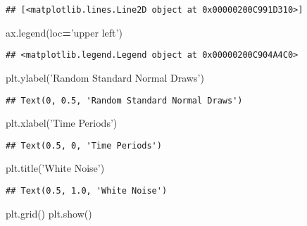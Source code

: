 \documentclass[
]{book}
\newenvironment{Shaded}{\begin{snugshade}}{\end{snugshade}}
\newcommand{\NormalTok}[1]{#1}
\newcommand{\OperatorTok}[1]{\textcolor[rgb]{0.81,0.36,0.00}{\textbf{#1}}}
\newcommand{\StringTok}[1]{\textcolor[rgb]{0.31,0.60,0.02}{#1}}
\begin{document}
\begin{verbatim}
## [<matplotlib.lines.Line2D object at 0x00000200C991D310>]
\end{verbatim}

\begin{Shaded}
\begin{Highlighting}[]
\NormalTok{ax.legend(loc}\OperatorTok{=}\StringTok{'upper left'}\NormalTok{)}
\end{Highlighting}
\end{Shaded}

\begin{verbatim}
## <matplotlib.legend.Legend object at 0x00000200C904A4C0>
\end{verbatim}

\begin{Shaded}
\begin{Highlighting}[]
\NormalTok{plt.ylabel(}\StringTok{'Random Standard Normal Draws'}\NormalTok{)}
\end{Highlighting}
\end{Shaded}

\begin{verbatim}
## Text(0, 0.5, 'Random Standard Normal Draws')
\end{verbatim}

\begin{Shaded}
\begin{Highlighting}[]
\NormalTok{plt.xlabel(}\StringTok{'Time Periods'}\NormalTok{)}
\end{Highlighting}
\end{Shaded}

\begin{verbatim}
## Text(0.5, 0, 'Time Periods')
\end{verbatim}

\begin{Shaded}
\begin{Highlighting}[]
\NormalTok{plt.title(}\StringTok{'White Noise'}\NormalTok{)}
\end{Highlighting}
\end{Shaded}

\begin{verbatim}
## Text(0.5, 1.0, 'White Noise')
\end{verbatim}

\begin{Shaded}
\begin{Highlighting}[]
\NormalTok{plt.grid()}
\NormalTok{plt.show()}
\end{Highlighting}
\end{Shaded}
\end{document}
